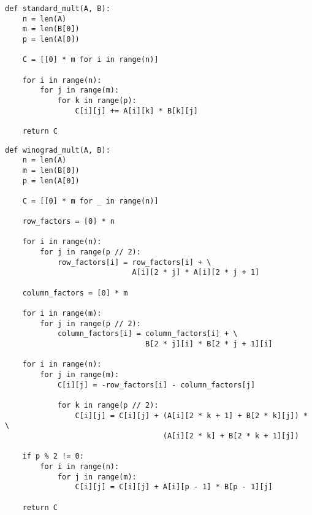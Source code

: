 \begin{center}
\captionsetup{justification=raggedright,singlelinecheck=off}
\begin{lstlisting}[label=lst:standard,caption=Стандартный алгоритм умножения матриц]
def standard_mult(A, B):
    n = len(A)
    m = len(B[0])
    p = len(A[0])

    C = [[0] * m for i in range(n)]

    for i in range(n):
        for j in range(m):
            for k in range(p):
                C[i][j] += A[i][k] * B[k][j]

    return C
\end{lstlisting} 
\end{center}
\clearpage
\begin{center}
\captionsetup{justification=raggedright,singlelinecheck=off}
\begin{lstlisting}[label=lst:winograd,caption=Алгоритм Винограда умножения матриц]
def winograd_mult(A, B):
    n = len(A)
    m = len(B[0])
    p = len(A[0])

    C = [[0] * m for _ in range(n)]

    row_factors = [0] * n

    for i in range(n):
        for j in range(p // 2):
            row_factors[i] = row_factors[i] + \
                             A[i][2 * j] * A[i][2 * j + 1]

    column_factors = [0] * m

    for i in range(m):
        for j in range(p // 2):
            column_factors[i] = column_factors[i] + \
                                B[2 * j][i] * B[2 * j + 1][i]

    for i in range(n):
        for j in range(m):
            C[i][j] = -row_factors[i] - column_factors[j]

            for k in range(p // 2):
                C[i][j] = C[i][j] + (A[i][2 * k + 1] + B[2 * k][j]) * \
                                    (A[i][2 * k] + B[2 * k + 1][j])
    
    if p % 2 != 0:
        for i in range(n):
            for j in range(m):
                C[i][j] = C[i][j] + A[i][p - 1] * B[p - 1][j]
    
    return C
\end{lstlisting}
\end{center}
\clearpage
